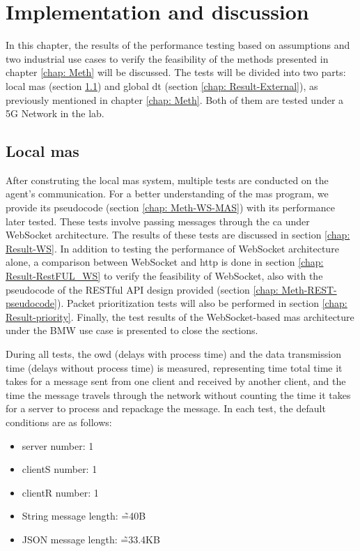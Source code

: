 \chapter{Implementation and discussion} \label{chap: Result}

In this chapter, the results of the performance testing based on assumptions 
and two industrial use cases to verify the feasibility of the methods presented 
in chapter \ref{chap: Meth} will be discussed. The tests will be divided into 
two parts: local \gls{mas} (section \ref{chap: Result-Internal}) and 
global \gls{dt} (section \ref{chap: Result-External}), as previously mentioned in 
chapter \ref{chap: Meth}. Both of them are tested under a 5G Network in the lab.



\section{Local \gls{mas}}\label{chap: Result-Internal}
After construting the local \gls{mas} system, multiple tests are conducted on the 
agent's communication. For a better understanding of the \gls{mas} program, we 
provide its pseudocode (section \ref{chap: Meth-WS-MAS}) with its performance later tested. These tests involve 
passing messages through the \gls{ca} under 
WebSocket architecture. The results of these tests are discussed in 
section \ref{chap: Result-WS}. In addition to testing the performance of WebSocket 
architecture alone, a comparison between WebSocket and \gls{http} is done in 
section \ref{chap: Result-RestFUL_WS} to verify 
the feasibility of WebSocket, also with the pseudocode of the RESTful API design 
provided (section \ref{chap: Meth-REST-pseudocode}). Packet prioritization tests will also be performed in 
section \ref{chap: Result-priority}. Finally, the test results of the 
WebSocket-based \gls{mas} architecture under the BMW use case is presented to 
close the sections. 





During all tests, the \gls{owd} (delays with process time) and 
the data transmission time (delays without process time) is measured, representing 
time total time it takes for a message sent from one client and received by another client, 
and the time the message travels through the network without counting the time 
it takes for a server to process and repackage the message. In each test, the 
default conditions are as follows: 

\begin{itemize}
    \item server number: 1
    \item clientS number: 1
    \item clientR number: 1
    \item String message length: \~=40B
    \item JSON message length: \~=33.4KB
\end{itemize}


